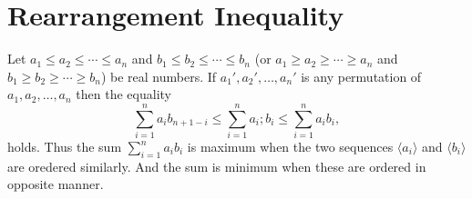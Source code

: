 \section{Rearrangement Inequality}
\begin{theorem}
  Let $a_1\leq a_2\leq\cdots\leq a_n$ and $b_1\leq b_2\leq\cdots\leq b_n$ (or $a_1\geq a_2\geq\cdots\geq a_n$ and $b_1\geq
  b_2\geq\cdots\geq b_n$) be real numbers. If $a_1', a_2', \ldots, a_n'$ is any permutation of $a_1, a_2, \ldots, a_n$ then the
  equality
  \begin{equation}
    \sum_{i=1}^na_ib_{n+1-i}\leq \sum_{i=1}^na_i;b_i\leq\sum_{i=1}^na_ib_i,
  \end{equation}
  holds. Thus the sum $\displaystyle\sum_{i=1}^na_ib_i$ is maximum when the two sequences $\langle a_i\rangle$ and $\langle
  b_i\rangle$ are oredered similarly. And the sum is minimum when these are ordered in opposite manner.
\end{theorem}

